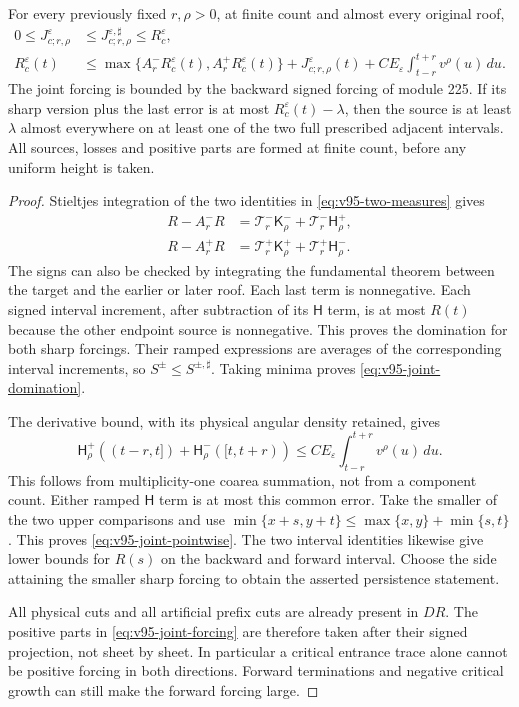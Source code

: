 \begin{theorem}
\label{thm:v95-bidirectional}
For every previously fixed $r,\rho>0$, at finite count and almost
every original roof,
\begin{align}
 0\le J_{c;r,\rho}^\varepsilon
 &\le J_{c;r,\rho}^{\varepsilon,\sharp}\le R_c^\varepsilon,
 \label{eq:v95-joint-domination}\\
 R_c^\varepsilon(t)
 &\le \max\{A_r^-R_c^\varepsilon(t),A_r^+R_c^\varepsilon(t)\}
       +J_{c;r,\rho}^\varepsilon(t)
       +C E_\varepsilon\int_{t-r}^{t+r}v^\rho(u)\,du.
 \label{eq:v95-joint-pointwise}
\end{align}
The joint forcing is bounded by the backward signed forcing of
module 225. If its sharp version plus the last error is at most
$R_c^\varepsilon(t)-\lambda$, then the source is at least $\lambda$
almost everywhere on at least one of the two full prescribed adjacent
intervals. All sources, losses and positive parts are formed at finite
count, before any uniform height is taken.
\end{theorem}
\begin{proof}
Stieltjes integration of the two identities in
\eqref{eq:v95-two-measures} gives
\begin{align*}
 R-A_r^-R&=\mathcal T_r^-\mathsf K_\rho^-
                         +\mathcal T_r^-\mathsf H_\rho^+,\\
 R-A_r^+R&=\mathcal T_r^+\mathsf K_\rho^+
                         +\mathcal T_r^+\mathsf H_\rho^-.
\end{align*}
The signs can also be checked by integrating the fundamental theorem
between the target and the earlier or later roof. Each last term is
nonnegative. Each signed interval increment, after subtraction of
its $\mathsf H$ term, is at most $R(t)$ because the other endpoint
source is nonnegative. This proves the domination for both sharp
forcings. Their ramped expressions are averages of the corresponding
interval increments, so $S^\pm\le S^{\pm,\sharp}$. Taking minima
proves \eqref{eq:v95-joint-domination}.

The derivative bound, with its physical angular density retained,
gives
\[
 \mathsf H_\rho^+((t-r,t])+\mathsf H_\rho^-([t,t+r))
 \le C E_\varepsilon\int_{t-r}^{t+r}v^\rho(u)\,du.
\]
This follows from multiplicity-one coarea summation, not from a
component count. Either ramped $\mathsf H$ term is at most this
common error. Take the smaller of the two upper comparisons and use
$\min\{x+s,y+t\}\le\max\{x,y\}+\min\{s,t\}$.
This proves \eqref{eq:v95-joint-pointwise}.
The two interval identities likewise give lower bounds for $R(s)$
on the backward and forward interval. Choose the side attaining the
smaller sharp forcing to obtain the asserted persistence statement.

All physical cuts and all artificial prefix cuts are already present
in $DR$. The positive parts in \eqref{eq:v95-joint-forcing} are
therefore taken after their signed projection, not sheet by sheet.
In particular a critical entrance trace alone cannot be positive
forcing in both directions. Forward terminations and negative critical
growth can still make the forward forcing large.
\end{proof}

